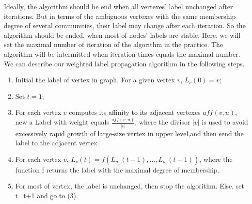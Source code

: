 \documentclass{acm_proc_article-sp}
\begin{document}
Ideally, the algorithm should be end when all vertexes' label unchanged after iterations. But in terms of the ambiguous vertexes with the same membership degree of several communities, their label may change after each iteration. So the algorithm should be ended, when most of nodes' labels are stable. Here, we will set the maximal number of iteration of the algorithm in the practice. The algorithm will be intermitted when iteration times equals the maximal number. We can describe our weighted label propagation algorithm in the following steps.
    \begin{enumerate}
\renewcommand{\labelenumi}{(\theenumi)}
\item Initial the label of vertex in graph. For a given vertex $v$, $L_v (0)=v$;
\item Set $t=1$;
\item For each vertex $v$ computes its affinity to its adjacent vertexes $aff (v,u)$, new a Label with weight equals $ \frac{aff (v,u)}{|v|}$, where the divisor $|v|$ is used to avoid excessively rapid growth of large-size vertex in upper level,and then send the label to the adjacent vertex.
\item For each vertex $v$, $L_{v}(t)=f(L_{u_{1}}(t-1),...,L_{u_{i}}(t-1))$, where the function f returns the label with the maximal degree of membership.
\item For most of vertex, the label is unchanged, then stop the algorithm. Else, set t=t+1 and go to (3).
\end{enumerate}
\end{document}
